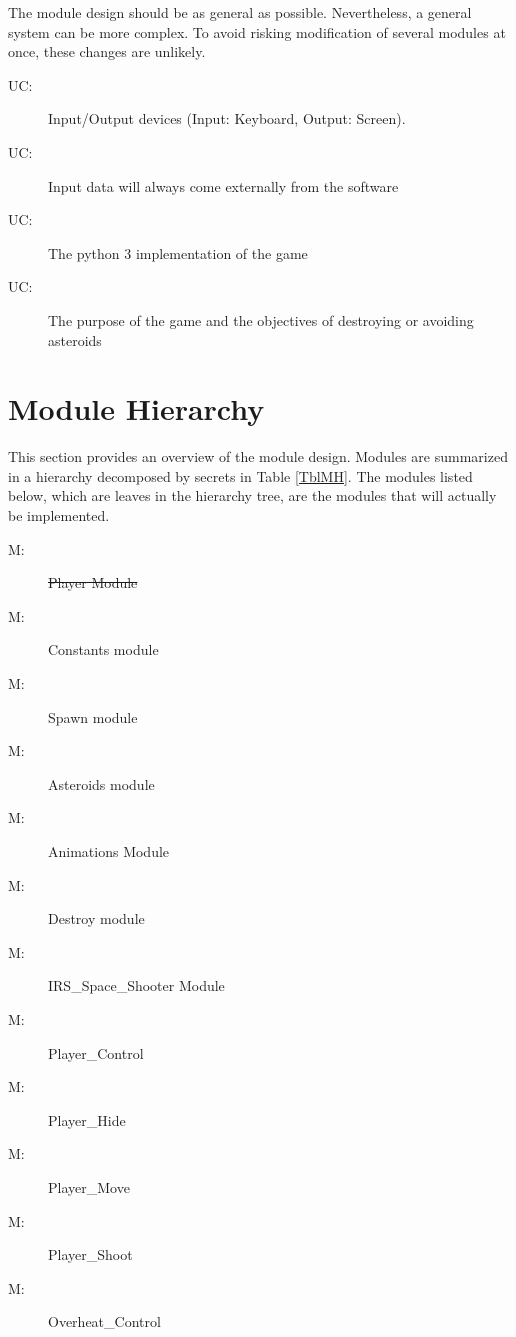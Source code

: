 \documentclass[12pt, titlepage]{article}
\newcounter{ucnum}
\newcommand{\uctheucnum}{UC\theucnum}
\newcounter{mnum}
\newcommand{\mthemnum}{M\themnum}
\begin{document}
The module design should be as general as possible. Nevertheless, a general system can be more complex. To avoid risking modification of several modules at once, these changes are unlikely. 

\begin{description}
\item[ \uctheucnum \label{ucIO}:] Input/Output devices
  (Input: Keyboard, Output: Screen).
\item[ \uctheucnum \label{ucInput}:] Input data will always come externally from the software
\item[ \uctheucnum \label{ucP3}:] The python 3 implementation of the game
\item[ \uctheucnum \label{ucPurpose}:] The purpose of the game and the objectives of destroying or avoiding asteroids

\end{description}

\section{Module Hierarchy} \label{SecMH}
This section provides an overview of the module design. Modules are summarized
in a hierarchy decomposed by secrets in Table \ref{TblMH}. The modules listed
below, which are leaves in the hierarchy tree, are the modules that will
actually be implemented.

\begin{description}
\item[ \mthemnum \label{mHA}:] \sout{Player Module} 
\item[ \mthemnum \label{mHB}:] Constants module
\item[ \mthemnum \label{mHC}:] Spawn module
\item[ \mthemnum \label{mHD}:] Asteroids module
\item[ \mthemnum \label{mHE}:] Animations Module
\item[ \mthemnum \label{mHF}:] Destroy module
\item[ \mthemnum \label{mHG}:] IRS\_Space\_Shooter Module
\item[ \mthemnum \label{mHH}:] Player\_Control
\item[ \mthemnum \label{mHI}:] Player\_Hide
\item[ \mthemnum \label{mHJ}:] Player\_Move
\item[ \mthemnum \label{mHK}:] Player\_Shoot
\item[ \mthemnum \label{mHL}:] Overheat\_Control
\end{description}
\end{document}
